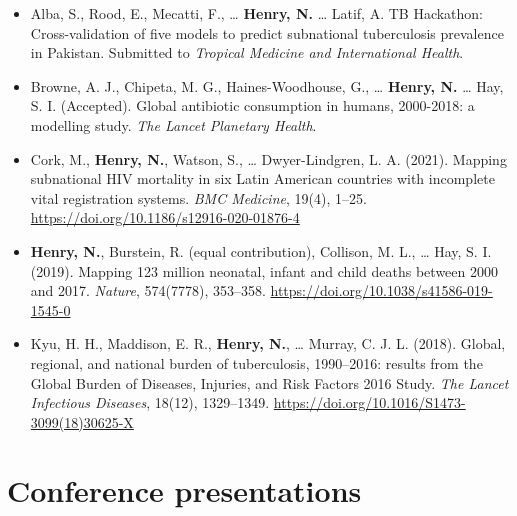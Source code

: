 \documentclass[
]{report}
\begin{document}
\begin{itemize}
\item
  Alba, S., Rood, E., Mecatti, F., \ldots{} \textbf{Henry, N.} \ldots{} Latif, A. TB Hackathon: Cross-validation of five models to predict subnational tuberculosis prevalence in Pakistan. Submitted to \emph{Tropical Medicine and International Health}.
\item
  Browne, A. J., Chipeta, M. G., Haines-Woodhouse, G., \ldots{} \textbf{Henry, N.} \ldots{} Hay, S. I. (Accepted). Global antibiotic consumption in humans, 2000-2018: a modelling study. \emph{The Lancet Planetary Health}.
\item
  Cork, M., \textbf{Henry, N.}, Watson, S., \ldots{} Dwyer-Lindgren, L. A. (2021). Mapping subnational HIV mortality in six Latin American countries with incomplete vital registration systems. \emph{BMC Medicine}, 19(4), 1--25. \url{https://doi.org/10.1186/s12916-020-01876-4}
\item
  \textbf{Henry, N.}, Burstein, R. (equal contribution), Collison, M. L., \ldots{} Hay, S. I. (2019). Mapping 123 million neonatal, infant and child deaths between 2000 and 2017. \emph{Nature}, 574(7778), 353--358. \url{https://doi.org/10.1038/s41586-019-1545-0}
\item
  Kyu, H. H., Maddison, E. R., \textbf{Henry, N.}, \ldots{} Murray, C. J. L. (2018). Global, regional, and national burden of tuberculosis, 1990--2016: results from the Global Burden of Diseases, Injuries, and Risk Factors 2016 Study. \emph{The Lancet Infectious Diseases}, 18(12), 1329--1349. \url{https://doi.org/10.1016/S1473-3099(18)30625-X}
\end{itemize}

\hypertarget{conference-presentations}{%
\section*{Conference presentations}\label{conference-presentations}}
\end{document}
